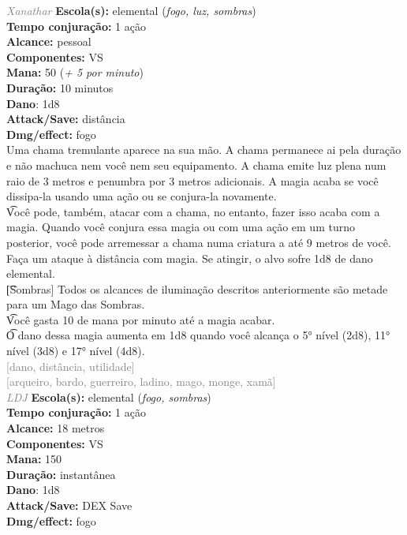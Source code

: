 \documentclass{RPG_Adventure}[2021/10/20]
\begin{document}
{\tiny \textcolor{gray}{\textit{Xanathar}}}\jump{}
{\small \t \textbf{Escola(s):} elemental (\textit{fogo, luz, sombras})\\\t \textbf{Tempo conjuração:} 1 ação\\\t \textbf{Alcance:} pessoal\\\t \textbf{Componentes:} VS\\\t \textbf{Mana:} 50 (\textit{+ 5 por minuto})\\\t \textbf{Duração:} 10 minutos\\\t \textbf{Dano}: 1d8\\\t \textbf{Attack/Save:} distância\\\t \textbf{Dmg/effect:} fogo\\}
{\normalsize Uma chama tremulante aparece na sua mão. A chama permanece ai pela duração e não machuca nem você nem seu equipamento. A chama emite luz plena num raio de 3 metros e penumbra por 3 metros adicionais. A magia acaba se você dissipa-la usando uma ação ou se conjura-la novamente.\\\t Você pode, também, atacar com a chama, no entanto, fazer isso acaba com a magia. Quando você conjura essa magia ou com uma ação em um turno posterior, você pode arremessar a chama numa criatura a até 9 metros de você. Faça um ataque à distância com magia. Se atingir, o alvo sofre 1d8 de dano elemental.\\\t [Sombras] Todos os alcances de iluminação descritos anteriormente são metade para um Mago das Sombras.\\\t Você gasta 10 de mana por minuto até a magia acabar.\\\t O dano dessa magia aumenta em 1d8 quando você alcança o 5° nível (2d8), 11° nível (3d8) e 17° nível (4d8).\\}
{\scriptsize \textcolor{gray}{[dano, distância, utilidade]\\}}
{\scriptsize \textcolor{gray}{[arqueiro, bardo, guerreiro, ladino, mago, monge, xamã]\\}}
{\tiny \textcolor{gray}{\textit{LDJ}}}\jump{}
{\small \t \textbf{Escola(s):} elemental (\textit{fogo, sombras})\\\t \textbf{Tempo conjuração:} 1 ação\\\t \textbf{Alcance:} 18 metros\\\t \textbf{Componentes:} VS\\\t \textbf{Mana:} 150\\\t \textbf{Duração:} instantânea\\\t \textbf{Dano}: 1d8\\\t \textbf{Attack/Save:} DEX Save\\\t \textbf{Dmg/effect:} fogo\\}
\end{document}
